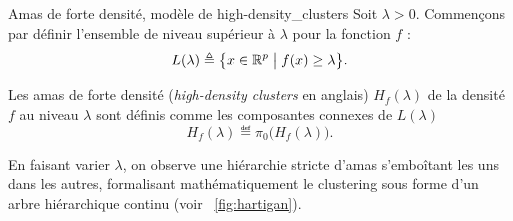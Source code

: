 \begin{Definition}{Amas de forte densité, modèle de  \cite{hartigan75}}{high-density_clusters}
Soit $\lambda > 0$. Commençons par définir l'ensemble de niveau supérieur à $\lambda$ pour la fonction $f$ :
\[
    L(\lambda) \triangleq \bigl\{ x \in \mathbb R^p   \bigm|   f(x) \ge \lambda \bigr\}.
\]

Les amas de forte densité (\emph{high-density clusters} en anglais) $H_f(\lambda)$ de la densité $f$ au niveau $\lambda$ sont définis comme les composantes connexes de $L(\lambda)$
\[
\boxed{
H_f(\lambda) \eqdef \pi_0 \big( H_f(\lambda)\bigr).
}
\]
\end{Definition}

En faisant varier $\lambda$, on observe une hiérarchie stricte d'amas s'emboîtant les uns dans les autres, formalisant mathématiquement le clustering sous forme d'un arbre hiérarchique continu (voir \Fig~\ref{fig:hartigan}). %


